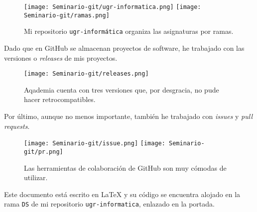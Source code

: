 \documentclass[10pt, a4paper]{aqademic}
\begin{document}
\begin{figure}[ht!]
\begin{center}
	\texttt{[image: Seminario-git/ugr-informatica.png]}
	\texttt{[image: Seminario-git/ramas.png]}
\end{center}
\caption{Mi repositorio \texttt{ugr-informática} organiza las asignaturas por ramas.}
\end{figure}

Dado que en GitHub se almacenan proyectos de software, he trabajado con las versiones o \textit{releases} de mis proyectos.

\begin{figure}[ht!]
\begin{center}
	\texttt{[image: Seminario-git/releases.png]}
\end{center}
\caption{Aqademia cuenta con tres versiones que, por desgracia, no pude hacer retrocompatibles.}
\end{figure}

\pagebreak

Por último, aunque no menos importante, también he trabajado con \textit{issues} y \textit{pull requests}.

\begin{figure}[ht!]
\begin{center}
	\texttt{[image: Seminario-git/issue.png]}
	\texttt{[image: Seminario-git/pr.png]}
\end{center}
\caption{Las herramientas de colaboración de GitHub son muy cómodas de utilizar.}
\end{figure}

Este documento está escrito en {\LaTeX} y su código se encuentra alojado en la rama \texttt{DS} de mi repositorio \texttt{ugr-informatica}, enlazado en la portada.
\end{document}
